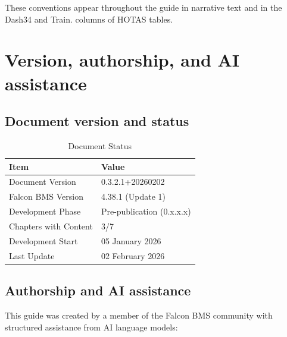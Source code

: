 \documentclass[11pt, a4paper, twoside]{report}
\newcommand{\docversion}{0.3.2.1}
\newcommand{\docbuild}{20260202}
\newcommand{\docstartdate}{05 January 2026}
\newcommand{\docenddate}{02 February 2026}
\newcommand{\chapterscompletedof}{3/7}
\newcommand{\fulldocversion}{\docversion+\docbuild}
\begin{document}
These conventions appear throughout the guide in narrative text and in the Dash34 and Train. columns of HOTAS tables.

\section{Version, authorship, and AI assistance}
\label{sec:C1-S4}

\subsection{Document version and status}
\label{sec:C1-S4-S1}

\begin{table}[H]
\centering
\caption{Document Status}
\label{tab:C1-doc-status}
\small
\renewcommand{\arraystretch}{1.25}
\begin{tabular}{L{4.5cm} L{9.0cm}}
\toprule
\textbf{Item} & \textbf{Value} \\
\midrule
Document Version & \fulldocversion \\
Falcon BMS Version & 4.38.1 (Update 1) \\
Development Phase & Pre-publication (0.x.x.x) \\
Chapters with Content & \chapterscompletedof \\
Development Start & \docstartdate \\
Last Update & \docenddate \\
\bottomrule
\end{tabular}
\end{table}

\subsection{Authorship and AI assistance}
\label{sec:C1-S4-S2}

This guide was created by a member of the Falcon BMS community with structured assistance from AI language models:
\end{document}
